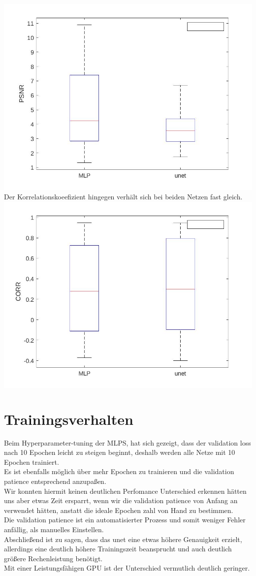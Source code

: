 \documentclass[8pt,a4paper]{article}
\begin{document}
\includegraphics[scale=0.2]{boxplotUnetPSNR.jpg}\\
Der Korrelationskoeefizient hingegen verhält sich bei beiden Netzen fast gleich.\\
\includegraphics[scale=0.2]{boxplotUnetCORR.jpg}


\section{Trainingsverhalten}

Beim Hyperparameter-tuning der MLPS, hat sich gezeigt, dass der validation loss nach 10 Epochen leicht zu steigen beginnt, deshalb werden alle Netze mit 10 Epochen trainiert.\\
Es ist ebenfalls möglich über mehr Epochen zu trainieren und die validation patience entsprechend anzupaßen.\\
Wir konnten hiermit keinen deutlichen Perfomance Unterschied erkennen hätten uns aber etwas Zeit ersparrt, wenn wir die validation patience von Anfang an verwendet hätten, anstatt die ideale Epochen zahl von Hand zu bestimmen.\\
Die validation patience ist ein automatisierter Prozess und somit weniger Fehler anfällig, als manuelles Einstellen.\\

Abschließend ist zu sagen, dass das unet eine etwas höhere Genauigkeit erzielt, allerdings eine deutlich höhere Trainingszeit beansprucht und auch deutlich größere Rechenleistung benötigt.\\
Mit einer Leistungsfähigen GPU ist der Unterschied vermutlich deutlich geringer.\\
\end{document}
